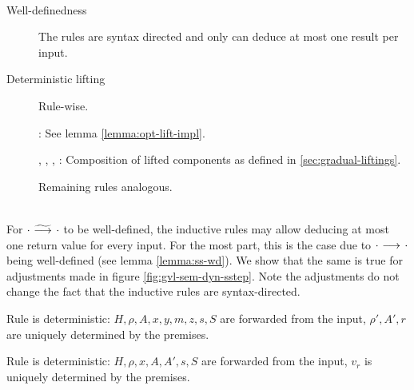 \begin{proofatend}~
    \begin{description}
        \item[Well-definedness] The rules are syntax directed and only can deduce at most one result per input.
        \item[Deterministic lifting] Rule-wise.
        
        :
        See lemma \ref{lemma:opt-lift-impl}.
        
        , , , :
        Composition of lifted components as defined in \ref{sec:gradual-liftings}.
        
        Remaining rules analogous.
    \end{description}
\end{proofatend}


\begin{proofatend}~\\
    For ${\cdot} \,\,{\widetilde{\longrightarrow}^{}}\,\, {\cdot}$ to be well-defined, the inductive rules may allow deducing at most one return value for every input.
    For the most part, this is the case due to ${\cdot} \,\,{\longrightarrow^{}}\,\, {\cdot}$ being well-defined (see lemma \ref{lemma:ss-wd}).
    We show that the same is true for adjustments made in figure \ref{fig:gvl-sem-dyn-sstep}.
    Note the adjustments do not change the fact that the inductive rules are syntax-directed.
    
    Rule  is deterministic:
    $H, \rho, A, x, y, m, z, s, S$ are forwarded from the input, $\rho', A', r$ are uniquely determined by the premises.
    
    Rule  is deterministic:
    $H, \rho, x, A, A', s, S$ are forwarded from the input, $v_r$ is uniquely determined by the premises.
\end{proofatend}

